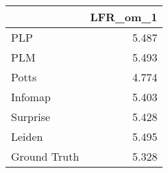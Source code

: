 \begin{tabular}{lr}
\toprule
{} & LFR_om_1 \\
\midrule
PLP          &    5.487 \\
PLM          &    5.493 \\
Potts        &    4.774 \\
Infomap      &    5.403 \\
Surprise     &    5.428 \\
Leiden       &    5.495 \\
Ground Truth &    5.328 \\
\bottomrule
\end{tabular}
